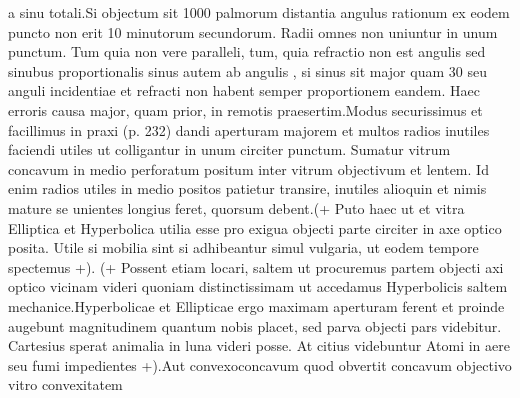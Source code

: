a sinu totali.\pend \pstart Si objectum sit 1000 palmorum distantia angulus rationum ex eodem puncto non erit 10 minutorum secundorum.  \pend \pstart Radii omnes non uniuntur in unum punctum. Tum quia non vere paralleli, tum, quia refractio\protect{} non est angulis sed sinubus proportionalis sinus autem ab angulis , si sinus sit major quam 30  seu anguli incidentiae\protect{} et refracti\protect{} non habent semper proportionem eandem. Haec erroris causa major, quam prior, in remotis praesertim.\pend \pstart Modus securissimus et facillimus in praxi (p. 232) dandi aperturam majorem et multos radios inutiles faciendi utiles ut colligantur in unum circiter punctum. Sumatur vitrum concavum in medio perforatum positum inter vitrum objectivum et lentem\protect{}. Id enim radios utiles in medio positos patietur transire, inutiles alioquin et nimis mature se unientes longius feret, quorsum debent.\pend \pstart (+ Puto haec ut et vitra Elliptica et Hyperbolica utilia esse pro exigua objecti parte circiter in axe optico\protect{} posita. Utile si mobilia sint si adhibeantur simul vulgaria, ut eodem tempore  spectemus +). \pend \pstart (+ Possent etiam  locari, saltem ut procuremus partem objecti axi optico\protect{} vicinam videri quoniam distinctissimam ut accedamus Hyperbolicis saltem mechanice.\pend \pstart Hyperbolicae et Ellipticae ergo maximam aperturam ferent et proinde augebunt magnitudinem quantum nobis placet, sed parva objecti pars videbitur. Cartesius\protect{} sperat animalia in luna videri posse. At citius videbuntur Atomi\protect{} in aere seu fumi impedientes +).\pend \pstart Aut  convexoconcavum quod obvertit concavum objectivo\protect{} vitro convexitatem 